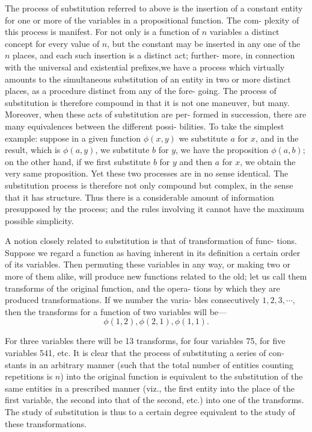 \documentclass[10pt, twoside]{extarticle}
\theoremstyle{breaktheorem}
\theoremstyle{mylemma}
\theoremstyle{mydefinition}
\theoremstyle{mycorollary}
\begin{document}
The process of substitution referred to above is the insertion of a constant
entity for one or more of the variables in a propositional function. The com-
plexity of this process is manifest. For not only is a function of \(n\) variables
a distinct concept for every value of \(n\), but the constant may be inserted in
any one of the \(n\) places, and each such insertion is a distinct act; further-
more, in connection with the universal and existential prefixes,we have a
process which virtually amounts to the simultaneous substitution of an entity
in two or more distinct places, as a procedure distinct from any of the fore-
going. The process of substitution is therefore compound in that it is not
one maneuver, but many. Moreover, when these acts of substitution are per-
formed in succession, there are many equivalences between the different possi-
bilities. To take the simplest example: suppose in a given function \(\phi(x, y)\)
we substitute \(a\) for \(x\), and in the result, which is \(\phi(a, y)\), we substitute \(b\) for \(y\),
 we have the proposition \(\phi(a, b)\); on the other hand, if we first substitute \(b\)
for \(y\) and then \(a\) for \(x\), we obtain the very same proposition. Yet these two
processes are in no sense identical. The substitution process is therefore not
only compound but complex, in the sense that it has structure. Thus there
is a considerable amount of information presupposed by the process; and
the rules involving it cannot have the maximum possible simplicity.

A notion closely related to substitution is that of transformation of func-
tions. Suppose we regard a function as having inherent in its definition a
certain order of its variables. Then permuting these variables in any way,
or making two or more of them alike, will produce new functions related to
the old; let us call them transforms of the original function, and the opera-
tions by which they are produced transformations. If we number the varia-
bles consecutively \(1, 2, 3, \cdots,\) then the transforms for a function of two
variables will be---
\[\phi(1, 2), \phi(2, 1), \phi(1, 1).\]

For three variables there will be 13 transforms, for four variables 75, for five
variables 541, etc. It is clear that the process of substituting a series of con-
stants in an arbitrary manner (such that the total number of entities counting
repetitions is \(n\)) into the original function is equivalent to the substitution of
the same entities in a prescribed manner (viz., the first entity into the place
of the first variable, the second into that of the second, etc.) into one of the
transforms. The study of substitution is thus to a certain degree equivalent
to the study of these transformations.
\end{document}
